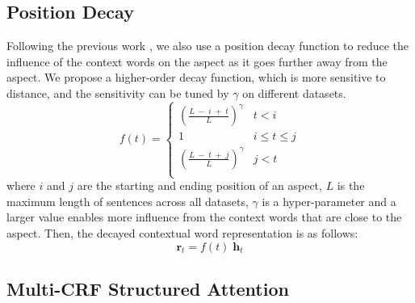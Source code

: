 \documentclass[11pt,a4paper]{article}
\begin{document}
\subsection{Position Decay}
Following the previous work \cite{lixin2018P18-1087, zhang-etal-2019-aspect, Tang:ACL2019}, we also use a position decay function to reduce the influence of the context words on the aspect as it goes further away from the aspect. 
We propose a higher-order decay function, which is more sensitive to distance, and the sensitivity can be tuned by $\gamma$ on different datasets. 
\setlength{\abovedisplayskip}{2pt} \setlength{\abovedisplayshortskip}{2pt}
\setlength{\belowdisplayskip}{8pt} \setlength{\belowdisplayshortskip}{8pt}
\begin{equation}
    f(t)=
    \begin{cases} 
      {(\frac{L \; - \;i\; +\; t} {L})}^{\gamma}  & t < i \\
      1 & i\leq t\leq j\\
      {(\frac{L\; -\; t\; +\;  j}{L})}^{\gamma}  & j < t \\
    \end{cases}
\end{equation}
where $i$ and $j$ are the starting and ending position of an aspect, $L$ is the maximum length of sentences across all datasets, $\gamma$ is a hyper-parameter and a larger value enables more influence from the context words that are close to the aspect.
Then, the decayed contextual word representation is as follows:
\begin{equation}
    \mathbf{r}_t = f(t) \; \mathbf{h}_{t}
\end{equation}


\subsection{Multi-CRF Structured Attention}
\end{document}
